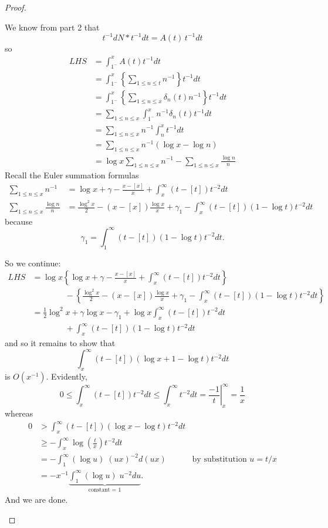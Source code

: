 \documentclass{article}
\begin{document}
\begin{proof}
\begin{enumerate}
We know from part 2 that
$$t^{-1} dN * t^{-1} dt = A(t) \, t^{-1} dt$$
so
\begin{align*}
LHS &= \int_{1^-}^x A(t) t^{-1} dt\\
&= \int_{1^-}^x \left\{ \sum_{1 \leq n \leq t} n^{-1} \right\} t^{-1} dt\\
&= \int_{1^-}^x \left\{ \sum_{1 \leq n \leq x} \delta_n(t) n^{-1} \right\} t^{-1} dt\\
&= \sum_{1 \leq n \leq x} \int_{1^-}^x n^{-1} \delta_n(t) t^{-1} dt\\
&= \sum_{1 \leq n \leq x} n^{-1} \int_n^x t^{-1} dt\\
&= \sum_{1 \leq n \leq x} n^{-1} (\log x - \log n)\\
&= \log x \sum_{1 \leq n \leq x} n^{-1} - \sum_{1 \leq n \leq x} \frac{\log n}{n}
\end{align*}
Recall the Euler summation formulas
\begin{align*}
\sum_{1 \leq n \leq x} n^{-1} &= \log x + \gamma - \frac{x - [x]}{x} + \int_x^\infty (t - [t]) t^{-2} dt\\
\sum_{1 \leq n \leq x} \frac{\log n}{n} &= \frac{\log^2 x}{2} - (x - [x]) \frac{ \log x}{x} + \gamma_1 - \int_x^\infty (t - [t]) (1 - \log t) t^{-2} dt
\end{align*}
because
$$\gamma_1 = \int_1^\infty (t - [t]) (1 - \log t) t^{-2} dt.$$

So we continue:
\begin{align*}
LHS &= \log x \left\{ \log x + \gamma - \frac{x - [x]}{x} + \int_x^\infty (t - [t]) t^{-2} dt \right\} \\
&\qquad \qquad - \left\{ \frac{\log^2 x}{2} - (x - [x]) \frac{ \log x}{x} + \gamma_1 - \int_x^\infty (t - [t]) (1 - \log t) t^{-2} dt \right\}\\
&= \frac12 \log^2 x + \gamma \log x - \gamma_1 + \log x \int_x^\infty (t - [t]) t^{-2} dt \\
&\qquad \qquad + \int_x^\infty (t - [t]) (1 - \log t) t^{-2} dt
\end{align*}
and so it remains to show that
$$\int_x^\infty (t - [t]) (\log x + 1 - \log t) t^{-2} dt$$
is $O(x^{-1})$. Evidently,
$$0 \leq \int_x^\infty (t - [t]) t^{-2} dt \leq \int_x^\infty t^{-2} dt = \left.\frac{-1}{t} \right|_x^{\infty} = \frac{1}{x}$$
whereas
\begin{align*}
0 &> \int_x^\infty (t - [t]) (\log x - \log t) t^{-2} dt\\
&\geq - \int_x^\infty \log \left(\frac tx\right) t^{-2} dt\\
&= -\int_1^\infty (\log u) \; (ux)^{-2} d(ux) &\text{by substitution } u = t / x\\
&= -x^{-1} \underbrace{\int_1^\infty (\log u) \; u^{-2} du}_{\text{constant = 1}}.
\end{align*}
And we are done.
\end{enumerate}
\end{proof}

\unless\ifdefined\IsMainDocument
\end{document}
